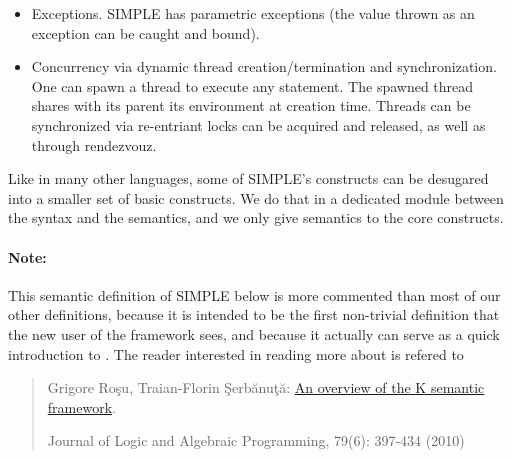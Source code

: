 {\begin{itemize}
next value in the input buffer, and the statement \texttt{write(e)}
evaluates \texttt{e} and outputs its value to the output buffer.  The
input and output buffers are lists of values.
\item Exceptions.  SIMPLE has parametric exceptions (the value thrown as
an exception can be caught and bound).
\item Concurrency via dynamic thread creation/termination and
synchronization.  One can spawn a thread to execute any statement.
The spawned thread shares with its parent its environment at creation time.
Threads can be synchronized via re-entriant locks can be acquired and released,
as well as through rendezvouz.
\end{itemize}
Like in many other languages, some of SIMPLE's constructs can be
desugared into a smaller set of basic constructs.  We do that in a 
dedicated module between the syntax and the semantics, and we only
give semantics to the core constructs.

\paragraph{Note:}{
This \K semantic definition of SIMPLE below is more commented than most
of our other \K definitions, because it is intended to be the first
non-trivial \K definition that the new user of the \K framework sees, and
because it actually can serve as a quick introduction to \K.  The reader
interested in reading more about \K is refered to
\begin{quote}
Grigore Ro\c su, Traian-Florin \c Serb\u anu\c t\u a:
\href{http://dx.doi.org/10.1016/j.jlap.2010.03.012}{An overview of the K semantic framework}.

Journal of Logic and Algebraic Programming, 79(6): 397-434 (2010)
\end{quote}
}
}

\vspace*{3ex}
